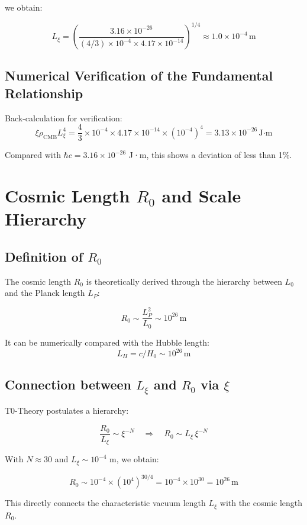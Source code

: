 \documentclass[12pt,a4paper]{article}
\numberwithin{equation}{section}
\begin{document}
	we obtain:
	
	\[
	L_\xi = \left(\frac{3.16 \times 10^{-26}}{(4/3) \times 10^{-4} \times 4.17 \times 10^{-14}}\right)^{1/4} \approx 1.0 \times 10^{-4}\,\text{m}
	\]
	
	\subsection{Numerical Verification of the Fundamental Relationship}
	
	Back-calculation for verification:
	\[
	\xi \rho_{\text{CMB}} L_\xi^4 = \frac{4}{3} \times 10^{-4} \times 4.17 \times 10^{-14} \times (10^{-4})^4 = 3.13 \times 10^{-26}\,\text{J·m}
	\]
	
	Compared with $\hbar c = 3.16 \times 10^{-26}$ J·m, this shows a deviation of less than 1\%.
	
	\section{Cosmic Length $R_0$ and Scale Hierarchy}
	
	\subsection{Definition of $R_0$}
	
	The cosmic length $R_0$ is theoretically derived through the hierarchy between $L_0$ and the Planck length $L_P$:
	
	\[
	R_0 \sim \frac{L_P^2}{L_0} \sim 10^{26}\,\text{m}
	\]
	
	It can be numerically compared with the Hubble length:
	\[
	L_H = c / H_0 \sim 10^{26}\,\text{m}
	\]
	
	\subsection{Connection between $L_\xi$ and $R_0$ via $\xi$}
	
	T0-Theory postulates a hierarchy:
	
	\[
	\frac{R_0}{L_\xi} \sim \xi^{-N} \quad \Rightarrow \quad R_0 \sim L_\xi \, \xi^{-N}
	\]
	
	With $N \approx 30$ and $L_\xi \sim 10^{-4}$ m, we obtain:
	
	\[
	R_0 \sim 10^{-4} \times (10^4)^{30/4} = 10^{-4} \times 10^{30} = 10^{26}\,\text{m}
	\]
	
	This directly connects the characteristic vacuum length $L_\xi$ with the cosmic length $R_0$.
	
\end{document}
